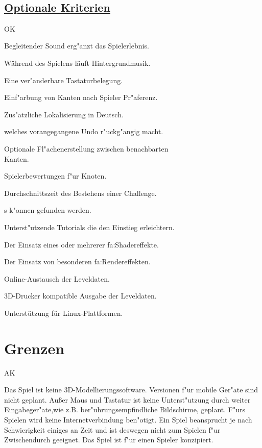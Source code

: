 ~\\


\subsection*{\underline{Optionale Kriterien}}

\begin{ids}{\gls{OK}}


\id[10] Begleitender Sound erg{"a}nzt das Spielerlebnis.

\id[20] Während des Spielens läuft Hintergrundmusik.

\id[30] Eine ver{"a}nderbare Tastaturbelegung.

\id[40] Einf{"a}rbung von Kanten nach Spieler Pr{"a}ferenz.

\id[50] Zus{"a}tzliche Lokalisierung in Deutsch.

 welches vorangegangene Undo r{"u}ckg{"a}ngig macht.

\id[70] Optionale Fl{"a}chenerstellung zwischen benachbarten \\Kanten.

\id[90] Spielerbewertungen f{"u}r Knoten.

\id[100] Durchschnittszeit des Bestehens einer Challenge.

s k{"o}nnen gefunden werden.

\id[120] Unterst{"u}tzende Tutorials die den Einstieg erleichtern.
	
\id[130] Der Einsatz eines oder mehrerer \gls{fa:Shadereffekte}.

\id[140] Der Einsatz von besonderen \gls{fa:Rendereffekte}n.

\id[150] Online-Austausch der Leveldaten.

\id[160] 3D-Drucker kompatible Ausgabe der Leveldaten.

\id[170] Unterstützung für Linux-Plattformen.

\end{ids}


%
%
\clearpage


\section{Grenzen}
\label{UF:Grenzen}

\begin{ids}{\gls{AK}}

	
	\id[10] Das Spiel ist keine 3D-Modellierungssoftware.
	\id[20] Versionen f{"u}r mobile Ger{"a}te sind nicht geplant.
	\id[20] Außer Maus und Tastatur ist keine Unterst{"u}tzung durch weiter Eingabeger{"a}te,wie z.B.  ber{"u}hrungsempfindliche Bildschirme, geplant.
	\id[40]F{"u}rs Spielen wird keine Internetverbindung ben{"o}tigt. 
	\id[50] Ein Spiel beansprucht je nach Schwierigkeit einiges an Zeit und ist deswegen nicht zum Spielen f{"u}r Zwischendurch geeignet.
	\id[60] Das Spiel ist f{"u}r einen Spieler konzipiert.
	
\end{ids}


